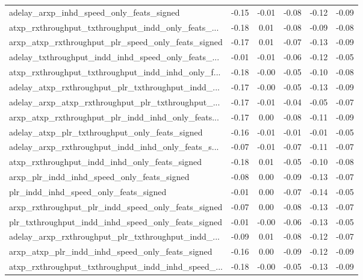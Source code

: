 \begin{tabular}{|l|*{4}{c}|r|}
adelay\_arxp\_inhd\_speed\_only\_feats\_signed           & -0.15 & -0.01 &   -0.08 &      -0.12 & -0.09 \\
atxp\_rxthroughput\_txthroughput\_indd\_only\_feats\_... & -0.18 &  0.01 &   -0.08 &      -0.09 & -0.08 \\
arxp\_atxp\_rxthroughput\_plr\_speed\_only\_feats\_signed & -0.17 &  0.01 &   -0.07 &      -0.13 & -0.09 \\
adelay\_txthroughput\_indd\_inhd\_speed\_only\_feats\_... & -0.01 & -0.01 &   -0.06 &      -0.12 & -0.05 \\
atxp\_rxthroughput\_txthroughput\_indd\_inhd\_only\_f... & -0.18 & -0.00 &   -0.05 &      -0.10 & -0.08 \\
adelay\_atxp\_rxthroughput\_plr\_txthroughput\_indd\_... & -0.17 & -0.00 &   -0.05 &      -0.13 & -0.09 \\
adelay\_arxp\_atxp\_rxthroughput\_plr\_txthroughput\_... & -0.17 & -0.01 &   -0.04 &      -0.05 & -0.07 \\
arxp\_atxp\_rxthroughput\_plr\_indd\_inhd\_only\_feats... & -0.17 &  0.00 &   -0.08 &      -0.11 & -0.09 \\
adelay\_atxp\_plr\_txthroughput\_only\_feats\_signed     & -0.16 & -0.01 &   -0.01 &      -0.01 & -0.05 \\
adelay\_arxp\_rxthroughput\_indd\_inhd\_only\_feats\_s... & -0.07 & -0.01 &   -0.07 &      -0.11 & -0.07 \\
atxp\_rxthroughput\_indd\_inhd\_only\_feats\_signed      & -0.18 &  0.01 &   -0.05 &      -0.10 & -0.08 \\
arxp\_plr\_indd\_inhd\_speed\_only\_feats\_signed         & -0.08 &  0.00 &   -0.09 &      -0.13 & -0.07 \\
plr\_indd\_inhd\_speed\_only\_feats\_signed              & -0.01 &  0.00 &   -0.07 &      -0.14 & -0.05 \\
arxp\_rxthroughput\_plr\_indd\_speed\_only\_feats\_signed & -0.07 &  0.00 &   -0.08 &      -0.13 & -0.07 \\
plr\_txthroughput\_indd\_inhd\_speed\_only\_feats\_signed & -0.01 & -0.00 &   -0.06 &      -0.13 & -0.05 \\
adelay\_arxp\_rxthroughput\_plr\_txthroughput\_indd\_... & -0.09 &  0.01 &   -0.08 &      -0.12 & -0.07 \\
arxp\_atxp\_plr\_indd\_inhd\_speed\_only\_feats\_signed    & -0.16 &  0.00 &   -0.09 &      -0.12 & -0.09 \\
atxp\_rxthroughput\_txthroughput\_indd\_inhd\_speed\_... & -0.18 & -0.00 &   -0.05 &      -0.13 & -0.09 \\

\end{tabular}
